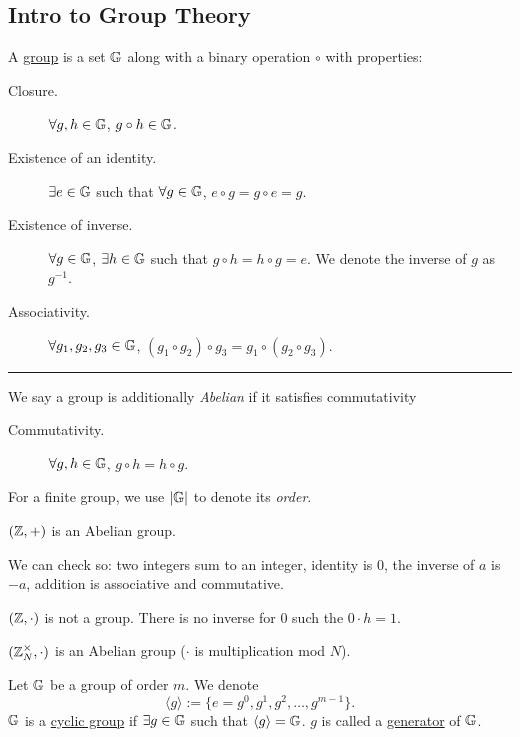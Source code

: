 \subsection{Intro to Group Theory}
\begin{definition}[Group]
    A \ul{group} is a set $\mathbb G$ along with a binary operation $\circ$ with properties:
    \begin{description}
        \item[Closure.] $\forall g, h\in \mathbb G$, $g\circ h\in \mathbb G$.
        \item[Existence of an identity.] $\exists e\in \mathbb G$ such that $\forall g\in \mathbb G$, $e\circ g = g\circ e = g$.
        \item[Existence of inverse.] $\forall g\in \mathbb G$, $\exists h\in \mathbb G$ such that $g\circ h = h\circ g = e$. We denote the inverse of $g$ as $g^{-1}$.
        \item[Associativity.] $\forall g_1, g_2, g_3\in \mathbb G$, $(g_1\circ g_2)\circ g_3 = g_1\circ(g_2\circ g_3)$.
    \end{description}

    \noindent\rule{\textwidth}{0.4pt}

    We say a group is additionally \emph{Abelian} if it satisfies commutativity
    \begin{description}
        \item[Commutativity.] $\forall g, h\in \mathbb G$, $g\circ h = h \circ g$.
    \end{description}
    For a finite group, we use $|\mathbb G|$ to denote its \emph{order}.
\end{definition}
\begin{example}
    $(\mathbb Z, +)$ is an Abelian group.

    We can check so: two integers sum to an integer, identity is $0$, the inverse of $a$ is $-a$, addition is associative and commutative.

    $(\mathbb Z, \cdot)$ is not a group. There is no inverse for 0 such the $0 \cdot h = 1$.

    $(\mathbb Z_N^\times, \cdot)$ is an Abelian group ($\cdot$ is multiplication mod $N$).
\end{example}

\begin{definition}
    Let $\mathbb G$ be a group of order $m$. We denote
    \[\langle g\rangle := \{e=g^0, g^1, g^2, \dots, g^{m-1}\}.\]
    $\mathbb G$ is a \ul{cyclic group} if $\exists g\in \mathbb G$ such that $\langle g\rangle = \mathbb G$. $g$ is called a \ul{generator} of $\mathbb G$.
\end{definition}

